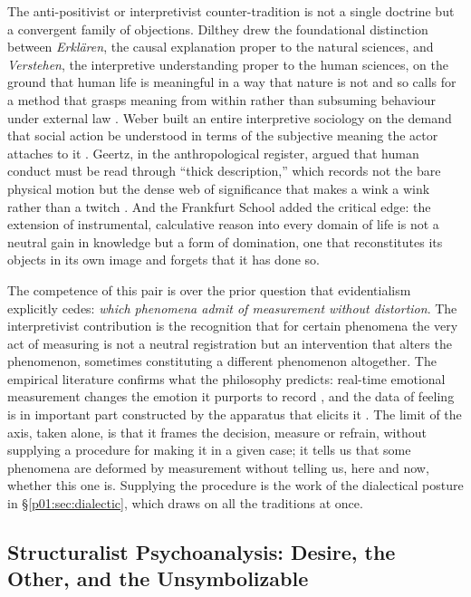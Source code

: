 \documentclass[11pt,a4paper]{article}
\begin{document}
The anti-positivist or interpretivist counter-tradition is not a single doctrine but a convergent family of objections. Dilthey drew the foundational distinction between \emph{Erklären}, the causal explanation proper to the natural sciences, and \emph{Verstehen}, the interpretive understanding proper to the human sciences, on the ground that human life is meaningful in a way that nature is not and so calls for a method that grasps meaning from within rather than subsuming behaviour under external law \parencite{dilthey1989introduction}. Weber built an entire interpretive sociology on the demand that social action be understood in terms of the subjective meaning the actor attaches to it \parencite{weber1978economy}. Geertz, in the anthropological register, argued that human conduct must be read through ``thick description,'' which records not the bare physical motion but the dense web of significance that makes a wink a wink rather than a twitch \parencite{geertz1973interpretation}. And the Frankfurt School added the critical edge: the extension of instrumental, calculative reason into every domain of life is not a neutral gain in knowledge but a form of domination, one that reconstitutes its objects in its own image and forgets that it has done so.

The competence of this pair is over the prior question that evidentialism explicitly cedes: \emph{which phenomena admit of measurement without distortion}. The interpretivist contribution is the recognition that for certain phenomena the very act of measuring is not a neutral registration but an intervention that alters the phenomenon, sometimes constituting a different phenomenon altogether. The empirical literature confirms what the philosophy predicts: real-time emotional measurement changes the emotion it purports to record \parencite{howell2018emotional}, and the data of feeling is in important part constructed by the apparatus that elicits it \parencite{boehner2007how}. The limit of the axis, taken alone, is that it frames the decision, measure or refrain, without supplying a procedure for making it in a given case; it tells us that some phenomena are deformed by measurement without telling us, here and now, whether this one is. Supplying the procedure is the work of the dialectical posture in §\ref{p01:sec:dialectic}, which draws on all the traditions at once.

\subsection{Structuralist Psychoanalysis: Desire, the Other, and the Unsymbolizable}\label{p01:sec:lacan}
\end{document}
